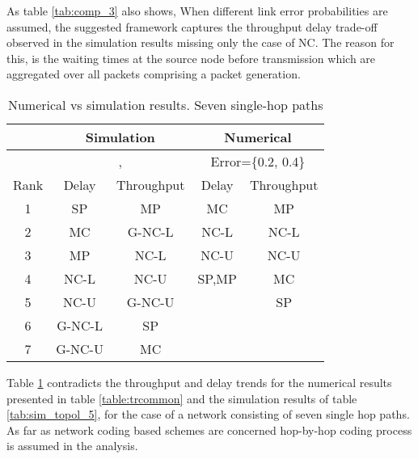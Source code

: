\documentclass[journal, onecolumn, 12pt]{IEEEtran}
\begin{document}
As table \ref{tab:comp_3} also shows, When different link error probabilities are assumed, the suggested framework captures the throughput delay trade-off observed in the simulation results missing only the case of NC.
The reason for this, is the waiting times at the source node before transmission which are aggregated over all packets comprising a packet generation.
\begin{table}[h]
\begin{center}
\scriptsize
\begin{tabular}{|c|c|c|c|c|}
\hline
     & \multicolumn{2}{|c|}{Simulation}     & \multicolumn{2}{|c|}{Numerical}                                   \\ \hline
     & \multicolumn{2}{|c|}{,} & \multicolumn{2}{|c|}{Error=\{0.2, 0.4\}} \\ \hline
Rank & Delay               & Throughput              & Delay            & Throughput            \\ \hline
1    & SP                 & MP                & MC              & MP          \\ \hline
2    & MC                 & G-NC-L                & NC-L              & NC-L      \\ \hline
3    & MP                & NC-L                & NC-U              & NC-U   \\ \hline
4    & NC-L               & NC-U                & SP,MP              & MC   \\ \hline
5    & NC-U              & G-NC-U                &               & SP     \\ \hline
6    & G-NC-L            & SP               &               &           \\ \hline
7    & G-NC-U            & MC                &               &           \\ \hline
\end{tabular}
\end{center}
\caption{Numerical vs simulation results. Seven single-hop paths}
\label{tab:comp_4}
\end{table}

Table \ref{tab:comp_4} contradicts the throughput and delay trends for the numerical results presented in table \ref{table:trcommon} and the simulation results of table \ref{tab:sim_topol_5},
for the case of a network consisting of seven single hop paths.
As far as network coding based schemes are concerned hop-by-hop coding process is assumed in the analysis.
\end{document}
